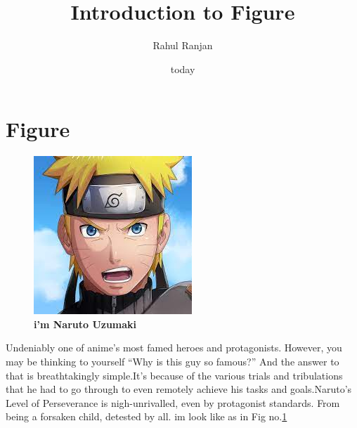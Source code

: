 \documentclass{article}
\title{Introduction to Figure}
\author{Rahul Ranjan}
\date{today}
\begin{document}
    \maketitle
    \newpage
    \tableofcontents
    \section{Figure}
    \newpage
    \centering
    \begin{figure}
    \centering
    \includegraphics[]{naruto.jpg}
    \caption{\textbf{i'm Naruto Uzumaki}}
    \label{naruto}
    \end{figure}
	\newpage
Undeniably one of anime’s most famed heroes and protagonists.\newline
However, you may be thinking to yourself  “Why is this guy so famous?”\newline
And the answer to that is breathtakingly  simple.It’s because of the various trials and tribulations that he had to go through to even remotely achieve his tasks and goals.Naruto’s Level of Perseverance is nigh-unrivalled, even by protagonist standards.\newline
From being a forsaken child, detested by all.  im look like as in Fig no.\ref{naruto}
\end{document}
